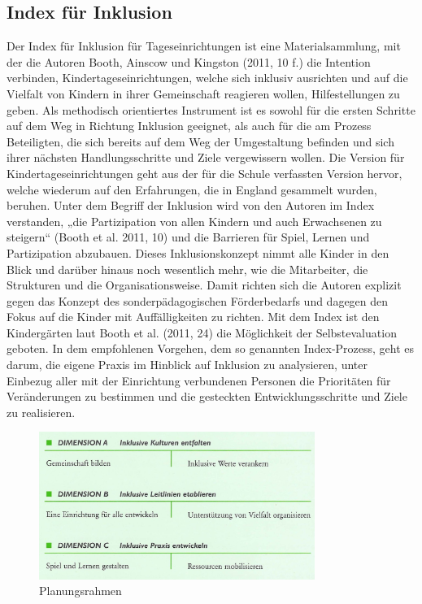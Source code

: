 \subsection{Index für Inklusion}
Der Index für Inklusion für Tageseinrichtungen ist eine Materialsammlung, mit der die Autoren Booth, Ainscow und Kingston (2011, 10 f.) die Intention verbinden, Kindertageseinrichtungen, welche sich inklusiv ausrichten und auf die Vielfalt von Kindern in ihrer Gemeinschaft reagieren wollen, Hilfestellungen zu geben. Als methodisch orientiertes Instrument ist es sowohl für die ersten Schritte auf dem Weg in Richtung Inklusion geeignet, als auch für die am Prozess Beteiligten, die sich bereits auf dem Weg der Umgestaltung befinden und sich ihrer nächsten Handlungsschritte und Ziele vergewissern wollen.
Die Version für Kindertageseinrichtungen geht aus der für die Schule verfassten Version hervor, welche wiederum auf den Erfahrungen, die in England gesammelt wurden, beruhen. Unter dem Begriff der Inklusion wird von den Autoren im Index verstanden, „die Partizipation von allen Kindern und auch Erwachsenen zu steigern“ (Booth et al. 2011, 10) und die Barrieren für Spiel, Lernen und Partizipation abzubauen. Dieses Inklusionskonzept nimmt alle Kinder in den Blick und darüber hinaus noch wesentlich mehr, wie die Mitarbeiter, die Strukturen und die Organisationsweise. Damit richten sich die Autoren explizit gegen das Konzept des sonderpädagogischen Förderbedarfs und dagegen den Fokus auf  die Kinder mit Auffälligkeiten zu richten.
Mit dem Index ist den Kindergärten laut Booth et al. (2011, 24) die Möglichkeit der Selbstevaluation geboten. In dem empfohlenen Vorgehen, dem so genannten Index-Prozess, geht es darum, die eigene Praxis im Hinblick auf Inklusion zu analysieren, unter Einbezug aller mit der Einrichtung verbundenen Personen die Prioritäten für Veränderungen zu bestimmen und die gesteckten Entwicklungsschritte und Ziele zu realisieren. 

\begin{figure}
  \centering
  \label{pic:planungsrahmen}
  \includegraphics[width=0.8\textwidth]{bilder/planungsrahmen}
  \caption{Planungsrahmen}
\end{figure}

